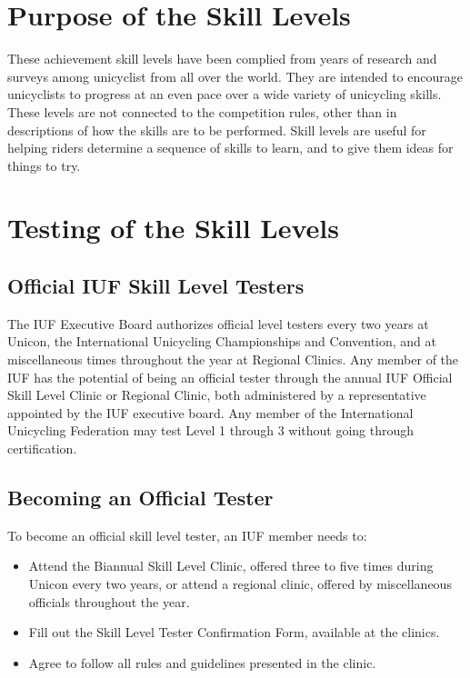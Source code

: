 
\section{Purpose of the Skill Levels}
These achievement skill levels have been complied from years of research and surveys among unicyclist from all over the world.
They are intended to encourage unicyclists to progress at an even pace over a wide variety of unicycling skills.
These levels are not connected to the competition rules, other than in descriptions of how the skills are to be performed.
Skill levels are useful for helping riders determine a sequence of skills to learn, and to give them ideas for things to try.

\section{Testing of the Skill Levels}

\subsection{Official IUF Skill Level Testers}
The IUF Executive Board authorizes official level testers every two years at Unicon, the International Unicycling Championships and Convention, and at miscellaneous times throughout the year at Regional Clinics.
Any member of the IUF has the potential of being an official tester through the annual IUF Official Skill Level Clinic or Regional Clinic, both administered by a representative appointed by the IUF executive board.
Any member of the International Unicycling Federation may test Level 1 through 3 without going through certification.

\subsection{Becoming an Official Tester}
To become an official skill level tester, an IUF member needs to:
\begin{itemize}
\item Attend the Biannual Skill Level Clinic, offered three to five times during Unicon every two years, or attend a regional clinic, offered by miscellaneous officials throughout the year.
\item Fill out the Skill Level Tester Confirmation Form, available at the clinics.
\item Agree to follow all rules and guidelines presented in the clinic.
\end{itemize}


